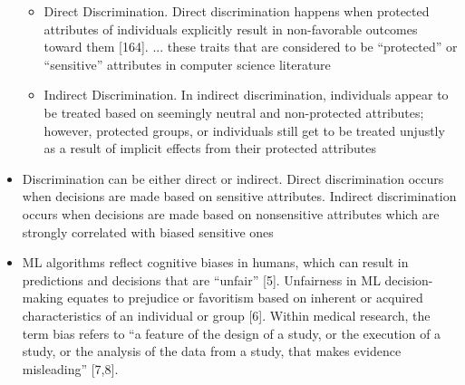 \documentclass[12pt, a4paper, oneside]{book}   	%
\begin{document}
\begin{itemize}
				\begin{itemize}
					\item Direct Discrimination. Direct discrimination happens when protected attributes of individuals explicitly result in non-favorable outcomes toward them [164]. ... these traits that are considered to be “protected” or “sensitive” attributes in computer science literature  \autocite{Mehrabi_2021}
					\item Indirect Discrimination. In indirect discrimination, individuals appear to be treated based on seemingly neutral and non-protected attributes; however, protected groups, or individuals still get to be treated unjustly as a result of implicit effects from their protected attributes \autocite{Mehrabi_2021}
				\end{itemize}
				\item Discrimination can be either direct or indirect. Direct discrimination occurs when decisions are made based on sensitive attributes. Indirect discrimination occurs when decisions are made based on nonsensitive attributes which are strongly correlated with biased sensitive ones \autocite{M62_Hajian_2013}
				\item ML algorithms reflect cognitive biases in humans, which can result in predictions and decisions that are “unfair” [5]. Unfairness in ML decision-making equates to prejudice or favoritism based on inherent or acquired characteristics of an individual or group [6]. Within medical research, the term bias refers to “a feature of the design of a study, or the execution of a study, or the analysis of the data from a study, that makes evidence misleading” [7,8]. \autocite{Montonaya_2025}
			\end{itemize}
		
		
\end{document}

